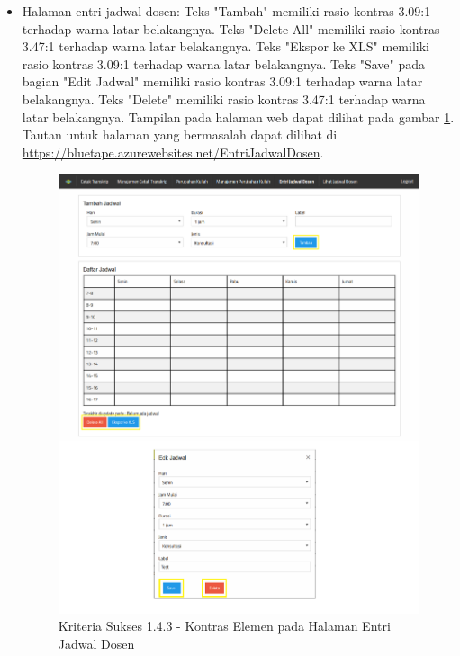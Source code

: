 \documentclass[a4paper,twoside]{article}
\begin{document}
\begin{enumerate}
\begin{itemize}
			\item Halaman entri jadwal dosen: Teks "Tambah" memiliki rasio kontras 3.09:1 terhadap warna latar belakangnya. Teks "Delete All" memiliki rasio kontras 3.47:1 terhadap warna latar belakangnya. Teks "Ekspor ke XLS" memiliki rasio kontras 3.09:1 terhadap warna latar belakangnya. Teks "Save" pada bagian "Edit Jadwal" memiliki rasio kontras 3.09:1 terhadap warna latar belakangnya. Teks "Delete" memiliki rasio kontras 3.47:1 terhadap warna latar belakangnya. Tampilan pada halaman web dapat dilihat pada gambar \ref{fig:1.4.3_contrast_minimum_6}. Tautan untuk halaman yang bermasalah dapat dilihat di \url{https://bluetape.azurewebsites.net/EntriJadwalDosen}.	
			\begin{figure}[H]
				\centering  
				\includegraphics[scale=0.3, frame]{kriteria-sukses-1-4-3-contrast-minimum-6}  
				\caption[Kriteria Sukses 1.4.3 - Kontras Elemen pada Halaman Entri Jadwal Dosen]{Kriteria Sukses 1.4.3 - Kontras Elemen pada Halaman Entri Jadwal Dosen}
				\label{fig:1.4.3_contrast_minimum_6}  
			\end{figure} 
			

\end{itemize}
\end{enumerate}
\end{document}

